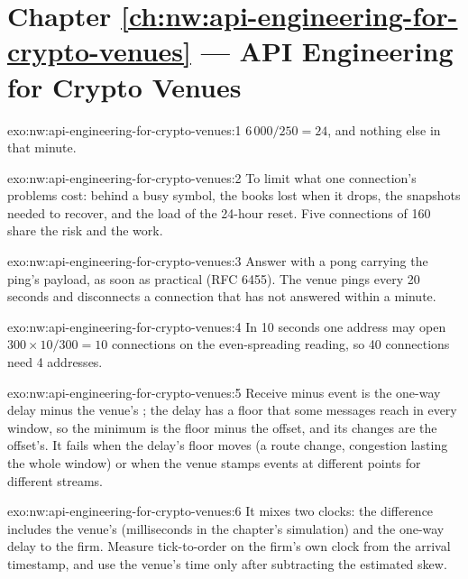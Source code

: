 \section*{Chapter \ref{ch:nw:api-engineering-for-crypto-venues} --- API Engineering for Crypto Venues}

\begin{solution}{exo:nw:api-engineering-for-crypto-venues:1}
$6\,000/250 = 24$, and nothing else in that minute.
\end{solution}

\begin{solution}{exo:nw:api-engineering-for-crypto-venues:2}
To limit what one connection's problems cost:  behind a busy symbol, the books lost when it drops, the snapshots needed to
recover, and the load of the 24-hour reset. Five connections of 160 share the risk and the work.
\end{solution}

\begin{solution}{exo:nw:api-engineering-for-crypto-venues:3}
Answer with a pong carrying the ping's payload, as soon as practical (RFC 6455). The venue pings every 20 seconds and disconnects a connection that has
not answered within a minute.
\end{solution}

\begin{solution}{exo:nw:api-engineering-for-crypto-venues:4}
In 10 seconds one address may open $300 \times 10/300 = 10$ connections on the even-spreading reading, so 40 connections need 4 addresses.
\end{solution}

\begin{solution}{exo:nw:api-engineering-for-crypto-venues:5}
Receive minus event is the one-way delay minus the venue's ; the delay has a floor that some messages reach in every window, so the
minimum is the floor minus the offset, and its changes are the offset's. It fails when the delay's floor moves (a route change, congestion lasting the
whole window) or when the venue stamps events at different points for different streams.
\end{solution}

\begin{solution}{exo:nw:api-engineering-for-crypto-venues:6}
It mixes two clocks: the difference includes the venue's  (milliseconds in the chapter's simulation) and the one-way delay to the firm.
Measure tick-to-order on the firm's own clock from the arrival timestamp, and use the venue's time only after subtracting the estimated skew.
\end{solution}


